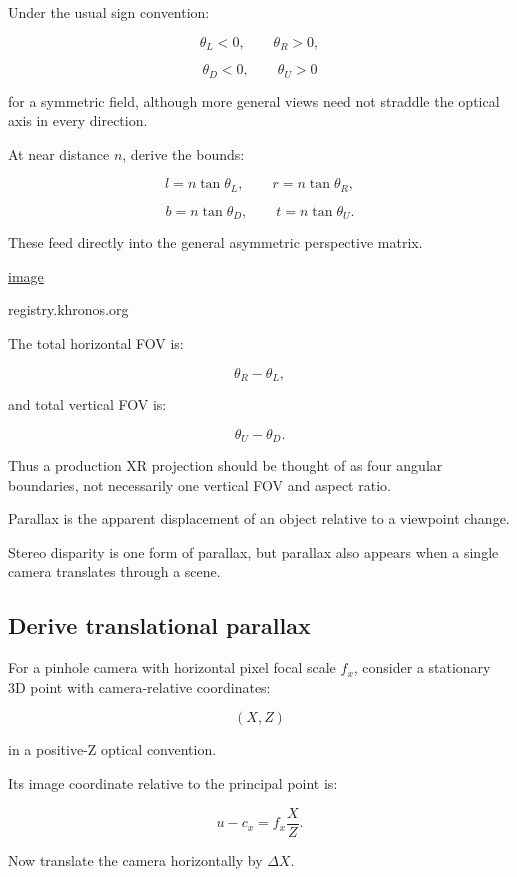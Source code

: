Under the usual sign convention:

\[ \theta_L<0,\qquad\theta_R>0, \]

\[ \theta_D<0,\qquad\theta_U>0 \]

for a symmetric field, although more general views need not straddle the optical axis in every direction.

At near distance \(n\), derive the bounds:

\[ \boxed{ l=n\tan\theta_L,\qquad r=n\tan\theta_R, } \]

\[ \boxed{ b=n\tan\theta_D,\qquad t=n\tan\theta_U. } \]

These feed directly into the general asymmetric perspective matrix. 

\href{https://www.google.com/s2/favicons?domain=https://registry.khronos.org&sz=32}{image}

registry.khronos.org

The total horizontal FOV is:

\[ \theta_R-\theta_L, \]

and total vertical FOV is:

\[ \theta_U-\theta_D. \]

Thus a production XR projection should be thought of as four angular boundaries, not necessarily one vertical FOV and aspect ratio.

Parallax is the apparent displacement of an object relative to a viewpoint change.

Stereo disparity is one form of parallax, but parallax also appears when a single camera translates through a scene.

\subsection{Derive translational parallax}\label{02-foundations-ii-ch035-derive-translational-parallax}

\hypertarget{02-foundations-ii-ch035-derive-translational-parallax}{}

For a pinhole camera with horizontal pixel focal scale \(f_x\), consider a stationary 3D point with camera-relative coordinates:

\[ (X,Z) \]

in a positive-Z optical convention.

Its image coordinate relative to the principal point is:

\[ u-c_x=f_x\frac XZ. \]

Now translate the camera horizontally by \(\Delta X\).


